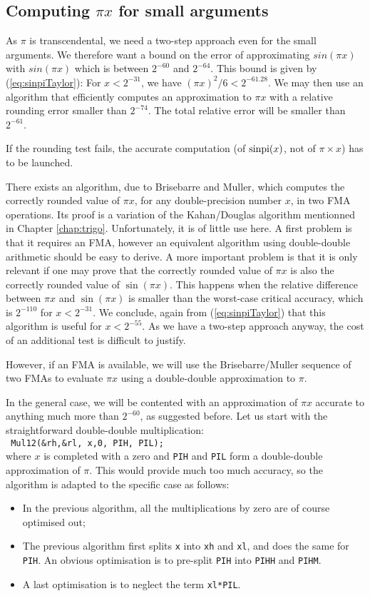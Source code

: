 \subsection{Computing $\pi x$ for small arguments}
As $\pi$ is transcendental, we need a two-step approach even for the small
arguments.  We therefore want a bound on the error of approximating
$sin(\pi x)$ with $sin(\pi x)$ which is between $2^{-60}$ and
$2^{-64}$.  This bound is given by (\ref{eq:sinpiTaylor}): For
$x<2^{-31}$, we have $(\pi x)^2/6 <2^{-61.28}$.  We may then use an
algorithm that efficiently computes an approximation to $\pi x$ with a
relative rounding error smaller than $2^{-74}$. The total relative
error will be smaller than $2^{-61}$. 

If the rounding test fails, the accurate computation (of $\operatorname{sinpi}(x)$,
not of $\pi\times x$) has to be launched.

There exists an algorithm, due to Brisebarre and Muller, which
computes the correctly rounded value of $\pi x$, for any
double-precision number $x$, in two FMA operations.  Its proof is a
variation of the Kahan/Douglas algorithm mentionned in Chapter
\ref{chap:trigo}. Unfortunately, it is of little use here. A first
problem is that it requires an FMA, however an equivalent algorithm
using double-double arithmetic should be easy to derive. A more
important problem is that it is only relevant if one may prove that
the correctly rounded value of $\pi x$ is also the correctly rounded
value of $\sin(\pi x)$. This happens when the relative difference
between $\pi x$ and $\sin(\pi x)$ is smaller than the worst-case
critical accuracy, which is $2^{-110}$ for
$x<2^{-31}$. We conclude, again from (\ref{eq:sinpiTaylor}) that this
algorithm is useful for $x<2^{-55}$.
As we have a two-step approach anyway, the cost of an additional test
is difficult to justify. 

However, if an FMA is available, we will use the Brisebarre/Muller sequence of two
FMAs to evaluate $\pi x$ using  a double-double
approximation to $\pi$.

In the general case, we will be contented with an approximation of
$\pi x$ accurate to anything much more than $2^{-60}$, as suggested
before. Let us start with the straightforward double-double multiplication:\\
\texttt{ Mul12(\&rh,\&rl, x,0, PIH, PIL);}\\
where $x$ is completed with a zero and \texttt{PIH} and \texttt{PIL}
form a double-double approximation of $\pi$. This would provide much
too much accuracy, so the algorithm is adapted to the specific case as
follows:
\begin{itemize}
\item In the previous algorithm, all the multiplications by zero are of course optimised out;
\item The previous algorithm first splits \texttt{x} into \texttt{xh}
  and \texttt{xl}, and does the same for \texttt{PIH}. An obvious
  optimisation is to pre-split \texttt{PIH} into \texttt{PIHH} and
  \texttt{PIHM}.
\item A last optimisation is to neglect the term \texttt{xl*PIL}.
\end{itemize}

